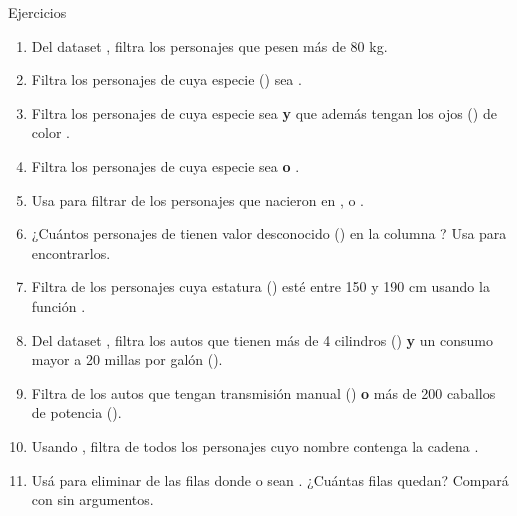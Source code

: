 \documentclass[8pt]{beamer}
\begin{document}
\begin{frame}[fragile]{Ejercicios}
\begin{enumerate}
	\item Del dataset , filtra los personajes que pesen más de 80 kg.
	\item Filtra los personajes de  cuya especie () sea .
	\item Filtra los personajes de  cuya especie sea  \textbf{y} que además tengan los ojos () de color .
	\item Filtra los personajes de  cuya especie sea  \textbf{o} .
	\item Usa  para filtrar de  los personajes que nacieron en ,  o .
	\item ¿Cuántos personajes de  tienen valor desconocido () en la columna ? Usa  para encontrarlos.
	\item Filtra de  los personajes cuya estatura () esté entre 150 y 190 cm usando la función .
	\item Del dataset , filtra los autos que tienen más de 4 cilindros () \textbf{y} un consumo mayor a 20 millas por galón ().
	\item Filtra de  los autos que tengan transmisión manual () \textbf{o} más de 200 caballos de potencia ().
	\item Usando , filtra de  todos los personajes cuyo nombre contenga la cadena .
	\item Usá  para eliminar de  las filas donde  o  sean . ¿Cuántas filas quedan? Compará con  sin argumentos.
\end{enumerate}
\end{frame}
\end{document}
